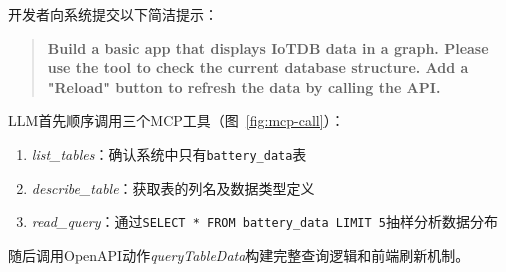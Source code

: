 开发者向系统提交以下简洁提示：

\begin{quote}
\small
\textbf{Build a basic app that displays IoTDB data in a graph. Please use the tool to check the current database structure. Add a "Reload" button to refresh the data by calling the API.}
\end{quote}

LLM首先顺序调用三个MCP工具（图~\ref{fig:mcp-call}）：
\begin{enumerate}
  \item \textit{list\_tables}：确认系统中只有\texttt{battery\_data}表
  \item \textit{describe\_table}：获取表的列名及数据类型定义
  \item \textit{read\_query}：通过\verb|SELECT * FROM battery_data LIMIT 5|抽样分析数据分布
\end{enumerate}

随后调用OpenAPI动作\textit{queryTableData}构建完整查询逻辑和前端刷新机制。

